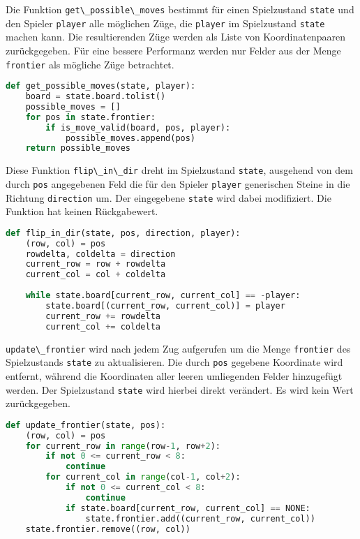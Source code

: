 Die Funktion \passthrough{\lstinline!get\_possible\_moves!} bestimmt für
einen Spielzustand \passthrough{\lstinline!state!} und den Spieler
\passthrough{\lstinline!player!} alle möglichen Züge, die
\passthrough{\lstinline!player!} im Spielzustand
\passthrough{\lstinline!state!} machen kann. Die resultierenden Züge
werden als Liste von Koordinatenpaaren zurückgegeben. Für eine bessere
Performanz werden nur Felder aus der Menge
\passthrough{\lstinline!frontier!} als mögliche Züge betrachtet.

\begin{lstlisting}[language=Python]
def get_possible_moves(state, player):
    board = state.board.tolist()
    possible_moves = []
    for pos in state.frontier:
        if is_move_valid(board, pos, player):
            possible_moves.append(pos)
    return possible_moves
\end{lstlisting}

Diese Funktion \passthrough{\lstinline!flip\_in\_dir!} dreht im
Spielzustand \passthrough{\lstinline!state!}, ausgehend von dem durch
\passthrough{\lstinline!pos!} angegebenen Feld die für den Spieler
\passthrough{\lstinline!player!} generischen Steine in die Richtung
\passthrough{\lstinline!direction!} um. Der eingegebene
\passthrough{\lstinline!state!} wird dabei modifiziert. Die Funktion hat
keinen Rückgabewert.

\begin{lstlisting}[language=Python]
def flip_in_dir(state, pos, direction, player):
    (row, col) = pos
    rowdelta, coldelta = direction
    current_row = row + rowdelta
    current_col = col + coldelta
    
    while state.board[current_row, current_col] == -player:
        state.board[(current_row, current_col)] = player
        current_row += rowdelta
        current_col += coldelta
\end{lstlisting}

\passthrough{\lstinline!update\_frontier!} wird nach jedem Zug
aufgerufen um die Menge \passthrough{\lstinline!frontier!} des
Spielzustands \passthrough{\lstinline!state!} zu aktualisieren. Die
durch \passthrough{\lstinline!pos!} gegebene Koordinate wird entfernt,
während die Koordinaten aller leeren umliegenden Felder hinzugefügt
werden. Der Spielzustand \passthrough{\lstinline!state!} wird hierbei
direkt verändert. Es wird kein Wert zurückgegeben.

\begin{lstlisting}[language=Python]
def update_frontier(state, pos):
    (row, col) = pos
    for current_row in range(row-1, row+2):
        if not 0 <= current_row < 8:
            continue
        for current_col in range(col-1, col+2):
            if not 0 <= current_col < 8:
                continue
            if state.board[current_row, current_col] == NONE:
                state.frontier.add((current_row, current_col))
    state.frontier.remove((row, col))
\end{lstlisting}

